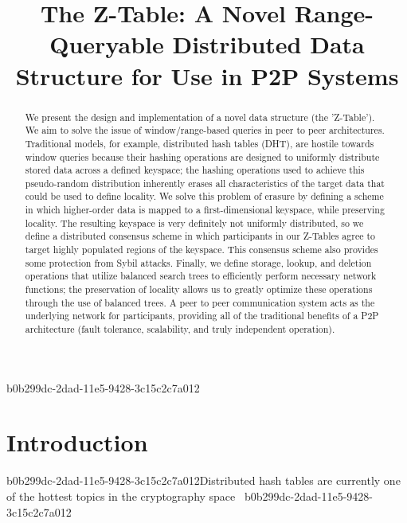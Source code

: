 \documentclass[12pt]{article}
\title{The Z-Table: A Novel Range-Queryable Distributed Data Structure for Use in P2P Systems}
\begin{document}
\maketitle

\begin{abstract}
We present the design and implementation of a novel data structure (the 'Z-Table'). We aim to solve the issue of window/range-based queries in peer to peer architectures. Traditional models, for example,  distributed hash tables (DHT), are hostile towards window queries because their hashing operations are designed to uniformly distribute stored data across a defined keyspace; the hashing operations used to achieve this pseudo-random distribution inherently erases all characteristics of the target data that could be used to define locality. We solve this problem of erasure by defining a scheme in which higher-order data is mapped to a first-dimensional keyspace, while preserving locality. The resulting keyspace is very definitely not uniformly distributed, so we define a distributed consensus scheme in which participants in our Z-Tables agree to target highly populated regions of the keyspace. This consensus scheme also provides some protection from Sybil attacks. Finally, we define storage, lookup, and deletion operations that utilize balanced search trees to efficiently perform necessary network functions; the preservation of locality allows us to greatly optimize these operations through the use of balanced trees. A peer to peer communication system acts as the underlying network for participants, providing all of the traditional benefits of a P2P architecture (fault tolerance, scalability, and truly independent operation).
\end{abstract}


\newpage
b0b299dc-2dad-11e5-9428-3c15c2c7a012\section{Introduction}
b0b299dc-2dad-11e5-9428-3c15c2c7a012Distributed hash tables are currently one of the hottest topics in the cryptography space~\cite{Stoica:2001dj,Rowstron:2001ea,Ratnasamy:2001wn}
b0b299dc-2dad-11e5-9428-3c15c2c7a012
\printbibliography
\end{document}

